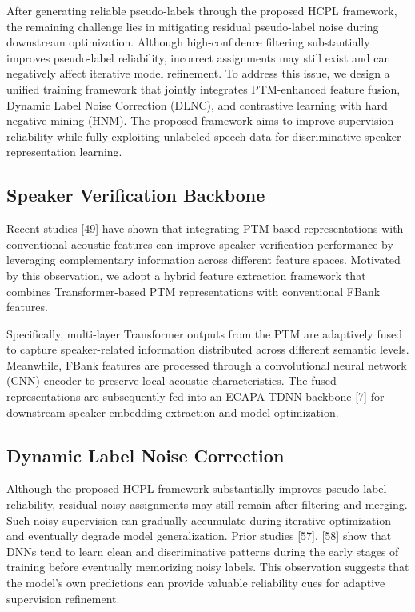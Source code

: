 \documentclass[lettersize,journal]{IEEEtran}
\begin{document}
After generating reliable pseudo-labels through the proposed HCPL framework, the remaining challenge lies in mitigating residual pseudo-label noise during downstream optimization. Although high-confidence filtering substantially improves pseudo-label reliability, incorrect assignments may still exist and can negatively affect iterative model refinement. To address this issue, we design a unified training framework that jointly integrates PTM-enhanced feature fusion, Dynamic Label Noise Correction (DLNC), and contrastive learning with hard negative mining (HNM). The proposed framework aims to improve supervision reliability while fully exploiting unlabeled speech data for discriminative speaker representation learning.

\subsection{Speaker Verification Backbone}

Recent studies [49] have shown that integrating PTM-based representations with conventional acoustic features can improve speaker verification performance by leveraging complementary information across different feature spaces. Motivated by this observation, we adopt a hybrid feature extraction framework that combines Transformer-based PTM representations with conventional FBank features.

Specifically, multi-layer Transformer outputs from the PTM are adaptively fused to capture speaker-related information distributed across different semantic levels. Meanwhile, FBank features are processed through a convolutional neural network (CNN) encoder to preserve local acoustic characteristics. The fused representations are subsequently fed into an ECAPA-TDNN backbone [7] for downstream speaker embedding extraction and model optimization.

\subsection{Dynamic Label Noise Correction}

Although the proposed HCPL framework substantially improves pseudo-label reliability, residual noisy assignments may still remain after filtering and merging. Such noisy supervision can gradually accumulate during iterative optimization and eventually degrade model generalization. Prior studies [57], [58] show that DNNs tend to learn clean and discriminative patterns during the early stages of training before eventually memorizing noisy labels. This observation suggests that the model's own predictions can provide valuable reliability cues for adaptive supervision refinement.
\end{document}
